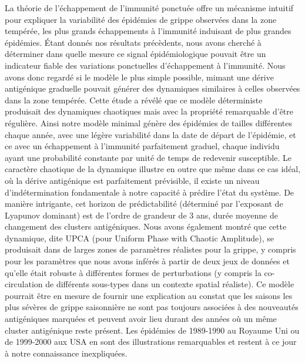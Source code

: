 La théorie de l'échappement de l'immunité ponctuée offre un mécanisme
intuitif pour expliquer la variabilité des épidémies de grippe
observées dans la zone tempérée, les plus grands échappements à
l'immunité induisant de plus grandes épidémies. Étant donnés nos
résultats précèdents, nous avons cherché à déterminer dans quelle
mesure ce signal épidémiologique pouvait être un indicateur fiable des
variations ponctuelles d'échappement à l'immunité. Nous avons donc
regardé si le modèle le plus simple possible, mimant une dérive
antigénique graduelle pouvait générer des dynamiques similaires à
celles observées dans la zone tempérée. Cette étude a révélé que ce
modèle déterministe produisait des dynamiques chaotiques mais avec la
propriété remarquable d'être régulière. Ainsi notre modèle minimal
génère des épidémies de tailles différentes chaque année, avec une
légère variabilité dans la date de départ de l'épidémie, et ce avec un
échappement à l'immunité parfaitement graduel, chaque individu ayant
une probabilité constante par unité de temps de redevenir susceptible.
Le caractère chaotique de la dynamique illustre en outre que même dans
ce cas idéal, où la dérive antigénique est parfaitement prévisible, il
existe un niveau d'indétermination fondamentale à notre capacité à
prédire l'état du système. De manière intrigante, cet horizon de
prédictabilité (déterminé par l'exposant de Lyapunov dominant) est de
l'ordre de grandeur de 3 ans, durée moyenne de changement des clusters
antigéniques. Nous avons également montré que cette dynamique, dite
UPCA (pour Uniform Phase with Chaotic Amplitude), se produisait dans
de larges zones de paramètres réalistes pour la grippe, y compris pour
les paramètres que nous avons inférés à partir de deux jeux de données
et qu'elle était robuste à différentes formes de perturbations (y
compris la co-circulation de différents sous-types dans un contexte
spatial réaliste). Ce modèle pourrait être en mesure de fournir une
explication au constat que les saisons les plus sévères de grippe
saisonnière ne sont pas toujours associées à des nouveautés
antigéniques marquées et peuvent avoir lieu durant des années où un
même cluster antigénique reste présent. Les épidémies de 1989-1990 au
Royaume Uni ou de 1999-2000 aux USA en sont des illustrations
remarquables \citep{Viboud2006b} et restent à ce jour à notre
connaissance inexpliquées.

